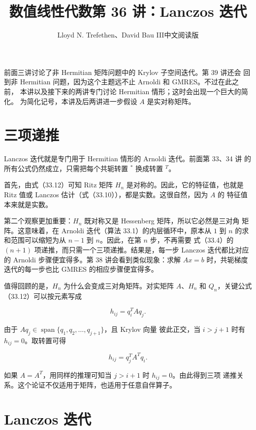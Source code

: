 \documentclass[UTF8,fontset=none,12pt]{ctexart}
\title{数值线性代数\quad 第 36 讲：Lanczos 迭代}
\author{Lloyd N. Trefethen、David Bau III\quad 中文阅读版}
\date{}
\begin{document}
\maketitle
\pagestyle{plain}

前面三讲讨论了非 Hermitian 矩阵问题中的 Krylov 子空间迭代。第 39 讲还会
回到非 Hermitian 问题，因为这个主题远不止 Arnoldi 和 GMRES。不过在此之前，
本讲以及接下来的两讲专门讨论 Hermitian 情形；这时会出现一个巨大的简化。
为简化记号，本讲及后两讲进一步假设 $A$ 是实对称矩阵。

\section*{三项递推}

Lanczos 迭代就是专门用于 Hermitian 情形的 Arnoldi 迭代。前面第 33、34 讲
的所有公式仍然成立，只需把每个共轭转置 $^*$ 换成转置 $^T$。

首先，由式（33.12）可知 Ritz 矩阵 $H_n$ 是对称的。因此，它的特征值，也就是
Ritz 值或 Lanczos 估计（式（33.10）），都是实数。这很自然，因为 $A$ 的
特征值本来就是实数。

第二个观察更加重要：$H_n$ 既对称又是 Hessenberg 矩阵，所以它必然是三对角
矩阵。这意味着，在 Arnoldi 迭代（算法 33.1）的内层循环中，原本从 $1$ 到
$n$ 的求和范围可以缩短为从 $n-1$ 到 $n$。因此，在第 $n$ 步，不再需要
式（33.4）的 $(n+1)$ 项递推，而只需一个三项递推。结果是，每一步 Lanczos
迭代都比对应的 Arnoldi 步骤便宜得多。第 38 讲会看到类似现象：求解
$Ax=b$ 时，共轭梯度迭代的每一步也比 GMRES 的相应步骤便宜得多。

值得回顾的是，$H_n$ 为什么会变成三对角矩阵。对实矩阵 $A$、$H_n$ 和
$Q_n$，关键公式（33.12）可以按元素写成

\begin{equation}
h_{ij}=q_i^TAq_j.
\tag{36.1}
\end{equation}

由于 $Aq_j\in\operatorname{span}\{q_1,q_2,\ldots,q_{j+1}\}$，且 Krylov 向量
彼此正交，当 $i>j+1$ 时有 $h_{ij}=0$。取转置可得

\begin{equation}
h_{ij}=q_j^TA^Tq_i.
\tag{36.2}
\end{equation}

如果 $A=A^T$，用同样的推理可知当 $j>i+1$ 时 $h_{ij}=0$。由此得到三项
递推关系。这个论证不仅适用于矩阵，也适用于任意自伴算子。

\section*{Lanczos 迭代}
\end{document}
